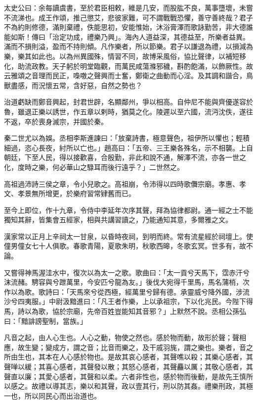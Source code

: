 
\begin{pinyinscope}
太史公曰：余每讀虞書，至於君臣相敕，維是几安，而股肱不良，萬事墮壞，未嘗不流涕也。成王作頌，推己懲艾，悲彼家難，可不謂戰戰恐懼，善守善終哉？君子不為約則修德，滿則棄禮，佚能思初，安能惟始，沐浴膏澤而歌詠勤苦，非大德誰能如斯！傳曰「治定功成，禮樂乃興」。海內人道益深，其德益至，所樂者益異。滿而不損則溢，盈而不持則傾。凡作樂者，所以節樂。君子以謙退為禮，以損減為樂，樂其如此也。以為州異國殊，情習不同，故博采風俗，協比聲律，以補短移化，助流政教。天子躬於明堂臨觀，而萬民咸蕩滌邪穢，斟酌飽滿，以飾厥性。故云雅頌之音理而民正，嘄噭之聲興而士奮，鄭衛之曲動而心淫。及其調和諧合，鳥獸盡感，而況懷五常，含好惡，自然之勢也？

治道虧缺而鄭音興起，封君世辟，名顯鄰州，爭以相高。自仲尼不能與齊優遂容於魯，雖退正樂以誘世，作五章以剌時，猶莫之化。陵遲以至六國，流沔沈佚，遂往不返，卒於喪身滅宗，并國於秦。

秦二世尤以為娛。丞相李斯進諫曰：「放棄詩書，極意聲色，祖伊所以懼也；輕積細過，恣心長夜，紂所以亡也。」趙高曰：「五帝、三王樂各殊名，示不相襲。上自朝廷，下至人民，得以接歡喜，合殷勤，非此和說不通，解澤不流，亦各一世之化，度時之樂，何必華山之騄耳而後行遠乎？」二世然之。

高祖過沛詩三侯之章，令小兒歌之。高祖崩，令沛得以四時歌儛宗廟。孝惠、孝文、孝景無所增更，於樂府習常肄舊而已。

至今上即位，作十九章，令侍中李延年次序其聲，拜為協律都尉。通一經之士不能獨知其辭，皆集會五經家，相與共講習讀之，乃能通知其意，多爾雅之文。

漢家常以正月上辛祠太一甘泉，以昏時夜祠，到明而終。常有流星經於祠壇上。使僮男僮女七十人俱歌。春歌青陽，夏歌朱明，秋歌西暤，冬歌玄冥。世多有，故不論。

又嘗得神馬渥洼水中，復次以為太一之歌。歌曲曰：「太一貢兮天馬下，霑赤汗兮沫流赭。騁容與兮跇萬里，今安匹兮龍為友。」後伐大宛得千里馬，馬名蒲梢，次作以為歌。歌詩曰：「天馬來兮從西極，經萬里兮歸有德。承靈威兮降外國，涉流沙兮四夷服。」中尉汲黯進曰：「凡王者作樂，上以承祖宗，下以化兆民。今陛下得馬，詩以為歌，協於宗廟，先帝百姓豈能知其音邪？」上默然不說。丞相公孫弘曰：「黯誹謗聖制，當族。」

凡音之起，由人心生也。人心之動，物使之然也。感於物而動，故形於聲；聲相應，故生變；變成方，謂之音；比音而樂之，及干戚羽旄，謂之樂也。樂者，音之所由生也，其本在人心感於物也。是故其哀心感者，其聲噍以殺；其樂心感者，其聲啴以緩；其喜心感者，其聲發以散；其怒心感者，其聲麤以厲；其敬心感者，其聲直以廉；其愛心感者，其聲和以柔。六者非性也，感於物而後動，是故先王慎所以感之。故禮以導其志，樂以和其聲，政以壹其行，刑以防其姦。禮樂刑政，其極一也，所以同民心而出治道也。


\end{pinyinscope}
